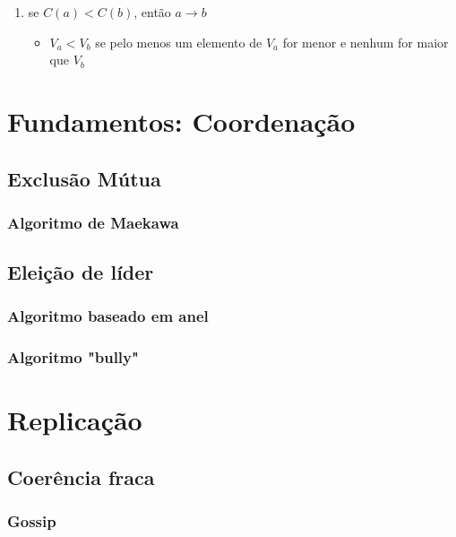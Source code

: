 \documentclass[12pt]{article}
\begin{document}
\begin{enumerate}
    \item se $C(a) < C(b)$, então $a \rightarrow b$
    \begin{itemize}[topsep=0pt]
        \item $V_a < V_b$ se pelo menos um elemento de $V_a$ for menor e nenhum for maior que $V_b$
    \end{itemize}
\end{enumerate}

\newpage

\section{Fundamentos: Coordenação}

\subsection{Exclusão Mútua}

\subsubsection{Algoritmo de Maekawa}

\subsection{Eleição de líder}

\subsubsection{Algoritmo baseado em anel}

\subsubsection{Algoritmo "bully"}

\newpage

\section{Replicação}

\subsection{Coerência fraca}

\subsubsection{Gossip}
\end{document}
